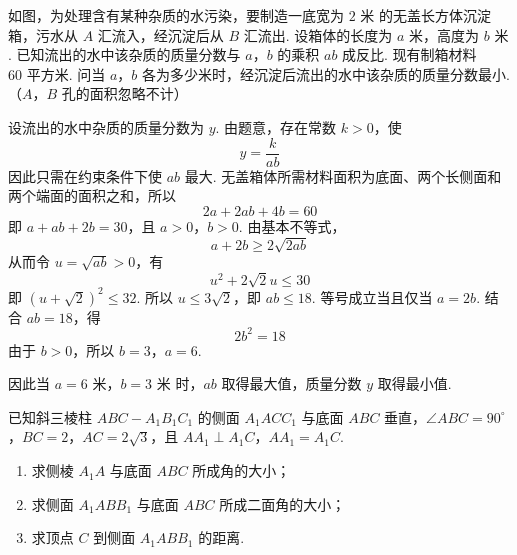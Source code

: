 \begin{problem}
如图，为处理含有某种杂质的水污染，要制造一底宽为 \(2\text{ 米}\) 的无盖长方体沉淀箱，污水从 \(A\) 汇流入，经沉淀后从 \(B\) 汇流出. 设箱体的长度为 \(a\text{ 米}\)，高度为 \(b\text{ 米}\). 已知流出的水中该杂质的质量分数与 \(a\)，\(b\) 的乘积 \(ab\) 成反比. 现有制箱材料 \(60\text{ 平方米}\). 问当 \(a\)，\(b\) 各为多少米时，经沉淀后流出的水中该杂质的质量分数最小. （\(A\)，\(B\) 孔的面积忽略不计）

\end{problem}

\begin{solution}
设流出的水中杂质的质量分数为 \(y\). 由题意，存在常数 \(k>0\)，使
\[
y=\frac{k}{ab}
\]
因此只需在约束条件下使 \(ab\) 最大. 无盖箱体所需材料面积为底面、两个长侧面和两个端面的面积之和，所以
\[
2a+2ab+4b=60
\]
即 \(a+ab+2b=30\)，且 \(a>0\)，\(b>0\).
由基本不等式，
\[
a+2b\geq2\sqrt{2ab}
\]
从而令 \(u=\sqrt{ab}>0\)，有
\[
u^{2}+2\sqrt{2}u\leq30
\]
即 \((u+\sqrt{2})^{2}\leq32\).
所以 \(u\leq3\sqrt{2}\)，即 \(ab\leq18\). 等号成立当且仅当 \(a=2b\). 结合 \(ab=18\)，得
\[
2b^{2}=18
\]
由于 \(b>0\)，所以 \(b=3\)，\(a=6\).

因此当 \(a=6\text{ 米}\)，\(b=3\text{ 米}\) 时，\(ab\) 取得最大值，质量分数 \(y\) 取得最小值.
\end{solution}

\begin{problem}
已知斜三棱柱 \(ABC - A_{1}B_{1}C_{1}\) 的侧面 \(A_{1}ACC_{1}\) 与底面 \(ABC\) 垂直，\(\angle ABC = 90^{\circ}\)，\(BC = 2\)，\(AC = 2\sqrt{3}\)，且 \(AA_{1} \perp A_{1}C\)，\(AA_{1} = A_{1}C\).

\begin{enumerate}
\item 求侧棱 \(A_{1}A\) 与底面 \(ABC\) 所成角的大小；
\item 求侧面 \(A_{1}ABB_{1}\) 与底面 \(ABC\) 所成二面角的大小；
\item 求顶点 \(C\) 到侧面 \(A_{1}ABB_{1}\) 的距离.
\end{enumerate}

\end{problem}

